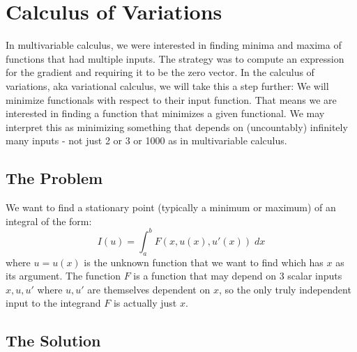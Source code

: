 \section{Calculus of Variations} 

In multivariable calculus, we were interested in finding minima and maxima of functions that had multiple inputs. The strategy was to compute an expression for the gradient and requiring it to be the zero vector. In the calculus of variations, aka variational calculus, we will take this a step further: We will minimize functionals with respect to their input function. That means we are interested in finding a function that minimizes a given functional. We may interpret this as minimizing something that depends on (uncountably) infinitely many inputs - not just 2 or 3 or 1000 as in multivariable calculus.

\subsection{The Problem}
We want to find a stationary point (typically a minimum or maximum) of an integral of the form:
\begin{equation}
 I(u) = \int_a^b F(x,u(x),u'(x)) \; dx
\end{equation}
where $u = u(x)$ is the unknown function that we want to find which has $x$ as its argument. The function $F$ is a function that may depend on 3 scalar inputs $x,u,u'$ where $u,u'$ are themselves dependent on $x$, so the only truly independent input to the integrand $F$ is actually just $x$. 




\subsection{The Solution}


